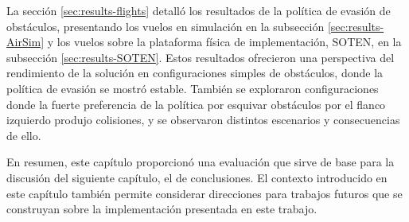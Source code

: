 La sección \ref{sec:results-flights} detalló los resultados de la política de evasión de obstáculos, presentando los vuelos en simulación en la subsección \ref{sec:results-AirSim} y los vuelos sobre la plataforma física de implementación, SOTEN, en la subsección \ref{sec:results-SOTEN}. Estos resultados ofrecieron una perspectiva del rendimiento de la solución en configuraciones simples de obstáculos, donde la política de evasión se mostró estable. También se exploraron configuraciones donde la fuerte preferencia de la política por esquivar obstáculos por el flanco izquierdo produjo colisiones, y se observaron distintos escenarios y consecuencias de ello.

En resumen, este capítulo proporcionó una evaluación que sirve de base para la discusión del siguiente capítulo, el de conclusiones. El contexto introducido en este capítulo también permite considerar direcciones para trabajos futuros que se construyan sobre la implementación presentada en este trabajo.
